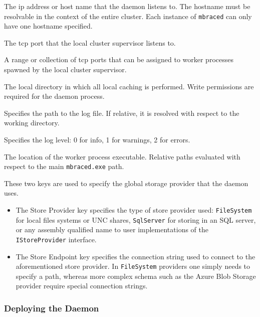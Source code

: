 \begin{description}[style=unboxed, font=\sffamily]
\item[Hostname] The ip address or host name that the daemon listens to.
The hostname must be resolvable in the context of the entire \mbrace{} cluster.
Each instance of \texttt{mbraced} can only have one hostname specified.
\item[Primary Port] The tcp port that the local cluster supervisor listens to.
\item[Worker Port Range] A range or collection of tcp ports that can be assigned
to worker processes spawned by the local cluster supervisor.
\item[Working Directory] The local directory in which all local caching is performed.
Write permissions are required for the daemon process.
\item[Log File] Specifies the path to the log file. If relative, it is resolved with
respect to the working directory.
\item[Log Level] Specifies the log level: 0 for info, 1 for warnings, 2 for errors.
\item[ProcessDomain Executable] The location of the worker process executable.
Relative paths evaluated with respect to the main \texttt{mbraced.exe} path.
\item[Store Provider/Endpoint]
These two keys are used to specify the global storage provider that the daemon uses.
\begin{itemize}
\item The \textsf{Store Provider} key specifies the type of store provider used:
\texttt{FileSystem} for local files systems or UNC shares, \texttt{SqlServer} for
storing in an SQL server, or any assembly qualified name to user implementations
of the \texttt{IStoreProvider} interface.
\item The \textsf{Store Endpoint} key specifies the connection string used to connect
to the aforementioned store provider. In \texttt{FileSystem} providers one simply needs
to specify a path, whereas more complex schema such as the Azure Blob Storage provider
require special connection strings.
\end{itemize}
\end{description}

\subsubsection*{Deploying the \TitularMbrace{} Daemon}

